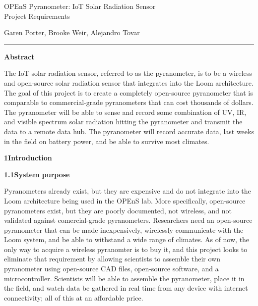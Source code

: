 \documentclass[10pt,draftclsnofoot,onecolumn,letterpaper]{article}
\begin{document}
\begin{Center}
{\fontsize{14pt}{16.8pt}\selectfont OPEnS Pyranometer: IoT Solar Radiation Sensor\\ Project Requirements\par}
\end{Center}\par
    
\begin{Center}
Garen Porter, Brooke Weir, Alejandro Tovar\\
\end{Center}\par
\hrule
\begin{Center}
{\fontsize{12pt}{16.8pt}\selectfont \textbf{Abstract}\par}
\end{Center}\par
    
{\fontsize{10pt}{12.0pt}\selectfont The IoT solar radiation sensor, referred to as the pyranometer, is to be a wireless and open-source solar radiation sensor that integrates into the Loom architecture. The goal of this project is to create a completely open-source pyranometer that is comparable to commercial-grade pyranometers that can cost thousands of dollars. The pyranometer will be able to sense and record some combination of UV, IR, and visible spectrum solar radiation hitting the pyranometer and transmit the data to a remote data hub. The pyranometer will record accurate data, last weeks in the field on battery power, and be able to survive most climates.
\par}\par
    
\newpage
    
    
{\fontsize{12pt}{12.0pt} \textbf{1\quad Introduction}\\\selectfont 
\par}\par
{\fontsize{10pt}{12.0pt} \textbf{1.1\quad System purpose}\\\selectfont 
\par}\par
{\fontsize{10pt}{12.0pt} Pyranometers already exist, but they are expensive and do not integrate into the Loom architecture being used in the OPEnS lab. More specifically, open-source pyranometers exist, but they are poorly documented, not wireless, and not validated against comercial-grade pyranometers. Researchers need an open-source pyranometer that can be made inexpensively, wirelessly communicate with the Loom system, and be able to withstand a wide range of climates. As of now, the only way to acquire a wireless pyranomter is to buy it, and this project looks to eliminate that requirement by allowing scientists to assemble their own pyranometer using open-source CAD files, open-source software, and a microcontroller. Scientists will be able to assemble the pyranometer, place it in the field, and watch data be gathered in real time from any device with internet connectivity; all of this at an affordable price.  \\\selectfont 
\par}\par
\end{document}
